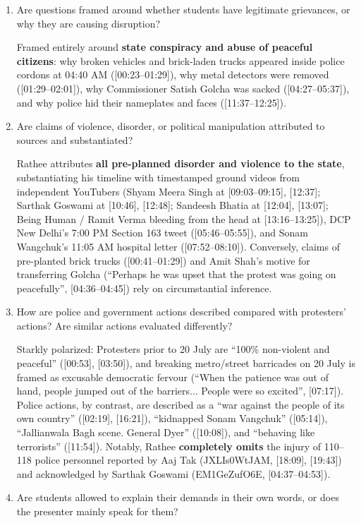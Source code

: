 \documentclass[10pt,a4paper]{article}
\begin{document}
{\begin{enumerate}[leftmargin=1.5em, itemsep=6pt, topsep=4pt]
  \item Are questions framed around whether students have legitimate grievances, or why they are causing disruption?\par\smallskip
  Framed entirely around \textbf{state conspiracy and abuse of peaceful citizens}: why broken vehicles and brick-laden trucks appeared inside police cordons at 04:40 AM ([00:23--01:29]), why metal detectors were removed ([01:29--02:01]), why Commissioner Satish Golcha was sacked ([04:27--05:37]), and why police hid their nameplates and faces ([11:37--12:25]).
  \item Are claims of violence, disorder, or political manipulation attributed to sources and substantiated?\par\smallskip
  Rathee attributes \textbf{all pre-planned disorder and violence to the state}, substantiating his timeline with timestamped ground videos from independent YouTubers (Shyam Meera Singh at [09:03--09:15], [12:37]; Sarthak Goswami at [10:46], [12:48]; Sandeesh Bhatia at [12:04], [13:07]; Being Human / Ramit Verma bleeding from the head at [13:16--13:25]), DCP New Delhi's 7:00 PM Section 163 tweet ([05:46--05:55]), and Sonam Wangchuk's 11:05 AM hospital letter ([07:52--08:10]). Conversely, claims of pre-planted brick trucks ([00:41--01:29]) and Amit Shah's motive for transferring Golcha (``Perhaps he was upset that the protest was going on peacefully'', [04:36--04:45]) rely on circumstantial inference.
  \item How are police and government actions described compared with protesters' actions? Are similar actions evaluated differently?\par\smallskip
  Starkly polarized: Protesters prior to 20 July are ``100\% non-violent and peaceful'' ([00:53], [03:50]), and breaking metro/street barricades on 20 July is framed as excusable democratic fervour (``When the patience was out of hand, people jumped out of the barriers... People were so excited'', [07:17]). Police actions, by contrast, are described as a ``war against the people of its own country'' ([02:19], [16:21]), ``kidnapped Sonam Vangchuk'' ([05:14]), ``Jallianwala Bagh scene. General Dyer'' ([10:08]), and ``behaving like terrorists'' ([11:54]). Notably, Rathee \textbf{completely omits} the injury of 110--118 police personnel reported by Aaj Tak (JXLIs0WtJAM, [18:09], [19:43]) and acknowledged by Sarthak Goswami (EM1GeZufO6E, [04:37--04:53]).
  \item Are students allowed to explain their demands in their own words, or does the presenter mainly speak for them?\par\smallskip

\end{enumerate}}
\end{document}
